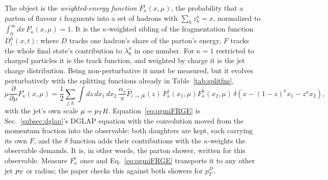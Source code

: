 The object is the \emph{weighted-energy function} \(F^i_\kappa(x,\mu)\), the
probability that a parton of flavour \(i\) fragments into a set of hadrons with
\(\sum_h z_h^\kappa = x\), normalized to \(\int_0^\infty dx\,F^i_\kappa(x,\mu)=1\).
It is the \(\kappa\)-weighted sibling of the fragmentation function \(D^h_i(x,t)\):
where \(D\) tracks one hadron's share of the parton's energy, \(F\) tracks the whole
final state's contribution to \(\lambda^\kappa_0\) in one number. For \(\kappa=1\)
restricted to charged particles it is the track function, and weighted by charge it
is the jet charge distribution. Being non-perturbative it must be measured, but it
evolves perturbatively with the splitting functions already in
Table~\ref{tab:splitfns},
\begin{equation}
	\mu\frac{\partial}{\partial\mu}F^i_\kappa(x,\mu)
	= \frac{1}{2}\sum_{j,k}\int dz\,dx_1\,dx_2\,
	\frac{\alpha_s}{\pi}\hat{P}_{i\to jk}(z)\,
	F^j_\kappa(x_1,\mu)F^k_\kappa(x_2,\mu)\,
	\delta\!\left(x - (1-z)^\kappa x_1 - z^\kappa x_2\right) ,
	\label{eq:qgmiFRGE}
\end{equation}
with the jet's own scale \(\mu=p_{\rm T}R\). Equation~\ref{eq:qgmiFRGE} is
Sec.~\ref{subsec:dglap}'s DGLAP equation with the convolution moved from the momentum
fraction into the observable: both daughters are kept, each carrying its own \(F\),
and the \(\delta\) function adds their contributions with the \(\kappa\)-weights the
observable demands. It is, in other words, the parton shower, written for this
observable. Measure \(F^i_\kappa\) once and Eq.~\ref{eq:qgmiFRGE} transports it to any
other jet \(p_{\rm T}\) or radius; the paper checks this against both showers for
\(p_T^D\).

